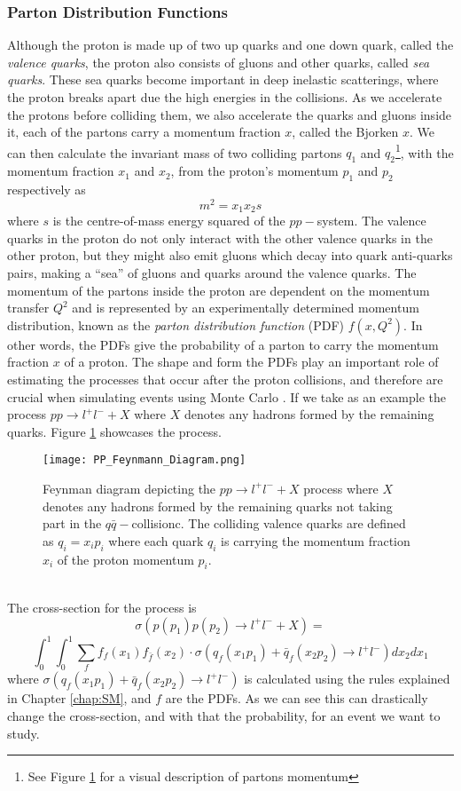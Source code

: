 \documentclass[12pt, a4paper]{book}
\begin{document}
\subsubsection{Parton Distribution Functions}\label{sec:pdf}
Although the proton is made up of two up quarks and one down quark, called the \textit{valence quarks}, the proton also consists of gluons and other quarks, called \textit{sea quarks}. These sea quarks become important in deep inelastic scatterings, 
where the proton breaks apart due the high energies in the collisions. As we accelerate the protons before colliding them, we also accelerate the quarks and gluons inside it, each of the partons carry a momentum fraction $x$, 
called the Bjorken $x$. We can then calculate the invariant mass of two colliding partons $q_1$ and $q_2$\footnote{See Figure \ref{fig:Feynann_PDF} for a visual description of partons momentum}, with the momentum fraction $x_1$ and $x_2$, from the proton's momentum $p_1$ and $p_2$ respectively as
$$
m^2=x_1x_2s
$$
where $s$ is the centre-of-mass energy squared of the $pp-$system. The valence quarks in the proton do not only interact with the other valence quarks in the other proton, but they might also emit gluons which decay into quark anti-quarks pairs, 
making a “sea” of gluons and quarks around the valence quarks. The momentum of the partons inside the proton are dependent on the momentum transfer $Q^2$ and is represented by an experimentally determined momentum distribution, 
known as the \textit{parton distribution function} (PDF) \cite{PDF} $f(x,Q^2)$. In other words, the PDFs give the probability of a parton to carry the momentum fraction $x$ of a proton. The shape and form the PDFs play 
an important role of estimating the processes that occur after the proton collisions, and therefore are crucial when simulating events using Monte Carlo \cite{MC_PDF}.  If we take as an example the process 
$pp\rightarrow l^+l^-+X$ where $X$ denotes any hadrons formed by the remaining quarks. Figure \ref{fig:Feynann_PDF} showcases the process.
\begin{figure}[!ht]
    \centering
    \texttt{[image: PP\_Feynmann\_Diagram.png]}
    \caption[Feynman diagram from $pp-$collision]{Feynman diagram depicting the $pp\rightarrow l^+l^-+X$ process where $X$ denotes any hadrons formed by the remaining quarks
    not taking part in the $q\bar{q}-$collisionc. The colliding valence quarks are defined as $q_i=x_ip_i$ where each quark $q_i$ is carrying the momentum fraction $x_i$ of the proton momentum $p_i$.}\label{fig:Feynann_PDF}
\end{figure}
\\The cross-section for the process is 
$$
\sigma\left(p(p_1) p(p_2)\rightarrow l^+l^- +X\right)=
$$
\begin{equation}\label{eq:PDF_xsec}
    \int_{0}^{1}\int_{0}^{1}\sum_{f}f_f(x_1)f_{\bar{f}}(x_2)\cdot\sigma\left(q_f(x_1p_1)+\bar{q}_f(x_2p_2)\rightarrow l^+l^- \right) dx_2dx_1
\end{equation}
where $\sigma\left(q_f(x_1p_1)+\bar{q}_f(x_2p_2)\rightarrow l^+l^- \right)$ is calculated using the rules explained in Chapter \ref{chap:SM}, and $f$ are the PDFs. As we can see this can drastically change the cross-section, and with that the 
probability, for an event we want to study. 
\end{document}
